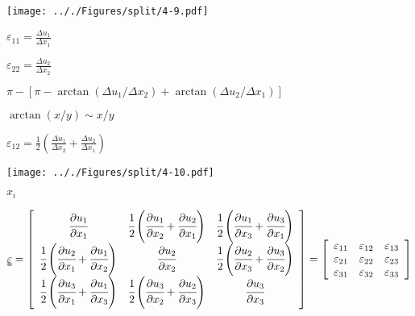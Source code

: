 \documentclass[onecolumn,11pt]{report}
\def\lthtmlcheckvsize{\ifdim\ht\sizebox<\vsize 
  \ifdim\wd\sizebox<\hsize\expandafter\hfill\fi \expandafter\vfill
  \else\expandafter\vss\fi}%
\begin{document}
{\newpage\clearpage
{}%
\texttt{[image: .././Figures/split/4-9.pdf]}%
\lthtmlpictureZ
\lthtmlcheckvsize\clearpage}

{\newpage\clearpage
{}%
$\displaystyle \varepsilon_{11} = \frac{\Delta u_1}{\Delta x_1}$%
\lthtmlindisplaymathZ
\lthtmlcheckvsize\clearpage}

{\newpage\clearpage
{}%
$\displaystyle \varepsilon_{22} = \frac{\Delta u_2}{\Delta x_2}$%
\lthtmlindisplaymathZ
\lthtmlcheckvsize\clearpage}

{\newpage\clearpage
{}%
$ \pi - \left[ \pi - \arctan(\Delta u_1 / \Delta x_2) + \arctan(\Delta u_2 / \Delta x_1) \right] $%
\lthtmlindisplaymathZ
\lthtmlcheckvsize\clearpage}

{\newpage\clearpage
{}%
$ \arctan(x/y) \sim x/y$%
\lthtmlindisplaymathZ
\lthtmlcheckvsize\clearpage}

{\newpage\clearpage
{}%
$\displaystyle \varepsilon_{12} = \frac{1}{2} \left( \frac{\Delta u_1}{\Delta x_2} + \frac{\Delta u_2}{\Delta x_1} \right)$%
\lthtmlindisplaymathZ
\lthtmlcheckvsize\clearpage}

{\newpage\clearpage
{}%
\texttt{[image: .././Figures/split/4-10.pdf]}%
\lthtmlpictureZ
\lthtmlcheckvsize\clearpage}

{\newpage\clearpage
{}%
$ x_i$%
\lthtmlindisplaymathZ
\lthtmlcheckvsize\clearpage}

{\newpage\clearpage
{}%
\begin{displaymath}\uuline{\varepsilon} =
\left[
\begin{array}{ccc}
\cfrac{\partial u_1}{\partial x_1} & \cfrac{1}{2} \left( \cfrac{\partial u_1}{\partial x_2} + \cfrac{\partial u_2}{\partial x_1} \right) &  \cfrac{1}{2} \left( \cfrac{\partial u_1}{\partial x_3} + \cfrac{\partial u_3}{\partial x_1} \right)\\
\cfrac{1}{2} \left( \cfrac{\partial u_2}{\partial x_1} + \cfrac{\partial u_1}{\partial x_2} \right) & \cfrac{\partial u_2}{\partial x_2} & \cfrac{1}{2} \left( \cfrac{\partial u_2}{\partial x_3} + \cfrac{\partial u_3}{\partial x_2} \right)\\
\cfrac{1}{2} \left( \cfrac{\partial u_3}{\partial x_1} + \cfrac{\partial u_1}{\partial x_3} \right) &  \cfrac{1}{2} \left( \cfrac{\partial u_3}{\partial x_2} + \cfrac{\partial u_2}{\partial x_3} \right) & \cfrac{\partial u_3}{\partial x_3}
\end{array}
\right] =
\left[
\begin{array}{ccc}
\varepsilon_{11} & \varepsilon_{12}  &  \varepsilon_{13} \\
\varepsilon_{21} & \varepsilon_{22}  &  \varepsilon_{23} \\
\varepsilon_{31} & \varepsilon_{32}  &  \varepsilon_{33}
\end{array}
\right]\end{displaymath}%
\lthtmldisplayZ
\lthtmlcheckvsize\clearpage}
\end{document}
